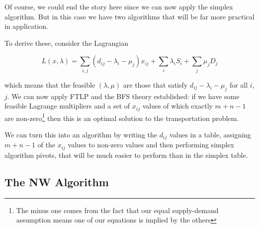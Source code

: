 \documentclass[11pt]{scrartcl}
\begin{document}
Of course, we could end the story here since we can now apply the simplex algorithm. But in this case we have two algorithms that will be far more practical in application.

To derive these, consider the Lagrangian

\begin{equation}
    L(x, \lambda) = \sum_{i, j} (d_{ij} - \lambda_i - \mu_j)x_{ij} + \sum_i \lambda_i S_i + \sum_j \mu_j D_j
\label{eqn:Lagrange Transport}
\end{equation}

which means that the feasible $(\lambda, \mu)$ are those that satisfy $d_{ij} - \lambda_i - \mu_j$ for all $i$, $j$. We can now apply FTLP and the BFS theory established: if we have some feasible Lagrange multipliers and a set of $x_{ij}$ values of which exactly $m+n-1$ are non-zero\footnote{The minus one comes from the fact that our equal supply-demand assumption means one of our equations is implied by the others} then this is an optimal solution to the transportation problem. 

We can turn this into an algorithm by writing the $d_{ij}$ values in a table, assigning $m+n-1$ of the $x_{ij}$ values to non-zero values and then performing simplex algorithm pivots, that will be much easier to perform than in the simplex table.

\subsection{The NW Algorithm}
\end{document}
